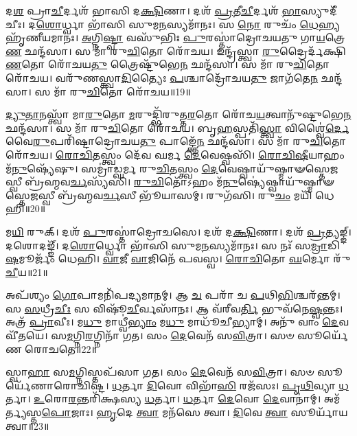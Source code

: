 𑌦\-\ul{𑌶} 𑌪𑍍𑌰𑌾\-\ul{𑌚𑍀}\-𑌰𑍍𑌦𑌶᳴ 𑌭𑌾𑌸𑌿 𑌦\-\ul{𑌕𑍍𑌷𑌿}\-𑌣𑌾। 
𑌦𑌶᳴ \ul{𑌪𑍍𑌰}\-𑌤𑍀\-\ul{𑌚𑍀}\-𑌰𑍍𑌦𑌶᳴ \ul{𑌭𑌾}\-𑌸𑍍𑌯𑍁𑌦𑍀᳴𑌚𑍀𑌃। 
𑌦\-\ul{𑌶𑍋}\-𑌰𑍍𑌧𑍍𑌵𑌾 𑌭𑌾᳴𑌸𑌿 𑌸𑍁𑌮\-\ul{𑌨}\-𑌸𑍍𑌯𑌮𑌾᳴𑌨𑌃। 
𑌸 \ul{𑌨𑍋} 𑌰𑍁𑌚𑌂᳴ \ul{𑌧𑍇}\-𑌹𑍍𑌯𑌹𑍃᳴𑌣𑍀𑌯𑌮𑌾𑌨𑌃। 
\-\ul{𑌅}\-𑌗𑍍𑌨𑌿\-\ul{𑌷𑍍𑌟𑍍𑌵𑌾} 𑌵𑌸𑍁᳴𑌭𑌿𑌃 \ul{𑌪𑍁}\-𑌰𑌸𑍍𑌤𑌾॑𑌦𑍍𑌰𑍋𑌚𑌯𑌤𑍁 𑌗𑌾\-\ul{𑌯}\-𑌤𑍍𑌰𑍇\-\ul{𑌣} 𑌛𑌨𑍍𑌦᳴𑌸𑌾। 
𑌸 𑌮𑌾᳴ 𑌰𑍁\-\ul{𑌚𑌿}\-𑌤𑍋 𑌰𑍋᳴𑌚𑌯। 
𑌇𑌨𑍍𑌦𑍍𑌰᳴𑌸𑍍𑌤𑍍𑌵𑌾 \ul{𑌰𑍁}\-𑌦𑍍𑌰𑍈𑌰𑍍𑌦᳴𑌕𑍍𑌷𑌿\-\ul{𑌣}\-𑌤𑍋 𑌰𑍋᳴𑌚𑌯\-\ul{𑌤𑍁} 𑌤𑍍𑌰𑍈𑌷𑍍𑌟𑍁᳴𑌭𑍇\-\ul{𑌨} 𑌛𑌨𑍍𑌦᳴𑌸𑌾। 
𑌸 𑌮𑌾᳴ 𑌰𑍁\-\ul{𑌚𑌿}\-𑌤𑍋 𑌰𑍋᳴𑌚𑌯। 
𑌵𑌰𑍁᳴𑌣𑌸𑍍𑌤𑍍𑌵𑌾\-\ul{𑌦𑌿}\-𑌤𑍍𑌯𑍈𑌃 \ul{𑌪}\-𑌶𑍍𑌚𑌾𑌦𑍍𑌰𑍋᳴𑌚𑌯\-\ul{𑌤𑍁} 𑌜𑌾𑌗᳴𑌤𑍇\-\ul{𑌨} 𑌛𑌨𑍍𑌦᳴𑌸𑌾। 
𑌸 𑌮𑌾᳴ 𑌰𑍁\-\ul{𑌚𑌿}\-𑌤𑍋 𑌰𑍋᳴𑌚𑌯॥19॥

\-\ul{𑌦𑍍𑌯𑍁}\-\-\ul{𑌤𑌾}\-𑌨𑌸𑍍𑌤𑍍𑌵𑌾᳴ 𑌮𑌾\-\ul{𑌰𑍁}\-𑌤𑍋 \ul{𑌮}\-𑌰𑍁𑌦𑍍𑌭𑌿᳴𑌰𑍁𑌤𑍍𑌤\-\ul{𑌰}\-𑌤𑍋 𑌰𑍋᳴𑌚\-\ul{𑌯}\-𑌤𑍍𑌵𑌾𑌨𑍁᳴𑌷𑍍𑌟𑍁𑌭𑍇\-\ul{𑌨} 𑌛𑌨𑍍𑌦᳴𑌸𑌾। 
𑌸 𑌮𑌾᳴ 𑌰𑍁\-\ul{𑌚𑌿}\-𑌤𑍋 𑌰𑍋᳴𑌚𑌯। 
𑌬𑍃\-\ul{𑌹}\-𑌸𑍍𑌪𑌤𑌿᳴\-\ul{𑌸𑍍𑌤𑍍𑌵𑌾} 𑌵𑌿𑌶𑍍𑌵𑍈॑\-\ul{𑌰𑍍𑌦𑍇}\-𑌵𑍈\-\ul{𑌰𑍁}\-𑌪𑌰𑌿᳴𑌷𑍍𑌟𑌾𑌦𑍍𑌰𑍋𑌚𑌯\-\ul{𑌤𑍁} 𑌪𑌾𑌙𑍍𑌕𑍍𑌤𑍇᳴\-\ul{𑌨} 𑌛𑌨𑍍𑌦᳴𑌸𑌾। 
𑌸 𑌮𑌾᳴ 𑌰𑍁\-\ul{𑌚𑌿}\-𑌤𑍋 𑌰𑍋᳴𑌚𑌯। 
\-\ul{𑌰𑍋}\-\-\ul{𑌚𑌿}\-𑌤𑌸𑍍𑌤𑍍𑌵𑌂 𑌦𑍇᳴𑌵 𑌘𑌰𑍍𑌮 \ul{𑌦𑍇}\-𑌵𑍇𑌷𑍍𑌵𑌸𑌿᳴। 
\-\ul{𑌰𑍋}\-\-\ul{𑌚𑌿}\-\-\ul{𑌷𑍀}\-𑌯𑌾𑌹𑌂 𑌮᳴\-\ul{𑌨𑍁}\-𑌷𑍍𑌯𑍇᳴𑌷𑍁। 
𑌸𑌮𑍍𑌰𑌾॑𑌡𑍍𑌘𑌰𑍍𑌮 𑌰𑍁\-\ul{𑌚𑌿}\-𑌤𑌸𑍍𑌤𑍍𑌵𑌂 \ul{𑌦𑍇}\-𑌵𑍇𑌷𑍍𑌵𑌾𑌯𑍁᳴𑌷𑍍𑌮𑌾𑍟𑌸𑍍𑌤𑍇\-\ul{𑌜}\-𑌸𑍍𑌵𑍀 𑌬𑍍𑌰᳴𑌹𑍍𑌮𑌵\-\ul{𑌰𑍍𑌚}\-𑌸𑍍𑌯᳴𑌸𑌿। 
\-\ul{𑌰𑍁}\-\-\ul{𑌚𑌿}\-𑌤𑍋᳴𑌽𑌹𑌂 𑌮᳴\-\ul{𑌨𑍁}\-𑌷𑍍𑌯𑍇॑𑌷𑍍𑌵𑌾𑌯𑍁᳴𑌷𑍍𑌮𑌾𑍟𑌸𑍍𑌤𑍇\-\ul{𑌜}\-𑌸𑍍𑌵𑍀 𑌬𑍍𑌰᳴𑌹𑍍𑌮𑌵\-\ul{𑌰𑍍𑌚}\-𑌸𑍀 𑌭𑍂᳴𑌯𑌾𑌸𑌮𑍍। 
𑌰𑍁𑌗᳴𑌸𑌿। 
𑌰𑍁\-\ul{𑌚𑌂} 𑌮𑌯𑌿᳴ 𑌧𑍇𑌹𑌿॥20॥

𑌮\-\ul{𑌯𑌿} 𑌰𑍁𑌕𑍍। 
𑌦𑌶᳴ \ul{𑌪𑍁}\-𑌰𑌸𑍍𑌤𑌾॑𑌦𑍍𑌰𑍋𑌚𑌸𑍇। 
𑌦𑌶᳴ 𑌦\-\ul{𑌕𑍍𑌷𑌿}\-𑌣𑌾। 
𑌦𑌶᳴ \ul{𑌪𑍍𑌰}\-𑌤𑍍𑌯𑌙𑍍𑌙𑍍। 
𑌦𑌶𑍋𑌦𑌙𑍍𑌙𑍍᳴। 
𑌦\-\ul{𑌶𑍋}\-𑌰𑍍𑌧𑍍𑌵𑍋 𑌭𑌾᳴𑌸𑌿 𑌸𑍁𑌮\-\ul{𑌨}\-𑌸𑍍𑌯𑌮𑌾᳴𑌨𑌃। 
𑌸 𑌨𑌃᳴ 𑌸\-\ul{𑌮𑍍𑌰𑌾}\-𑌡𑌿\-\ul{𑌷}\-𑌮𑍂𑌰𑍍𑌜𑌂᳴ 𑌧𑍇𑌹𑌿। 
\-\ul{𑌵𑌾}\-𑌜𑍀 \ul{𑌵𑌾}\-𑌜𑌿𑌨𑍇᳴ 𑌪𑌵𑌸𑍍𑌵। 
\-\ul{𑌰𑍋}\-\-\ul{𑌚𑌿}\-𑌤𑍋 \ul{𑌘}\-𑌰𑍍𑌮𑍋 𑌰𑍁᳴\-\ul{𑌚𑍀}\-𑌯॥21॥
\anuvakamend[\-\ul{𑌰𑍋}\-\-\ul{𑌚}\-\-\ul{𑌯} \ul{𑌧𑍇}\-\-\ul{𑌹𑌿} 𑌨𑌵᳴ 𑌚]

𑌅𑌪᳴𑌶𑍍𑌯𑌂 \ul{𑌗𑍋}\-𑌪𑌾𑌮𑌨𑌿᳴𑌪𑌦𑍍𑌯𑌮𑌾𑌨𑌮𑍍। 
𑌆 \ul{𑌚} 𑌪𑌰𑌾᳴ 𑌚 \ul{𑌪}\-𑌥𑌿\-\ul{𑌭𑌿}\-𑌶𑍍𑌚𑌰᳴𑌨𑍍𑌤𑌮𑍍। 
𑌸 \ul{𑌸}\-𑌧𑍍𑌰𑍀\-\ul{𑌚𑍀𑌃} 𑌸 𑌵𑌿𑌷𑍂᳴\-\ul{𑌚𑍀}\-𑌰𑍍𑌵𑌸𑌾᳴𑌨𑌃। 
𑌆 𑌵᳴𑌰𑍀𑌵\-\ul{𑌰𑍍𑌤𑌿} 𑌭𑍁𑌵᳴𑌨𑍇\-\ul{𑌷𑍍𑌵}\-𑌨𑍍𑌤𑌃। 
𑌅𑌤𑍍𑌰᳴ \ul{𑌪𑍍𑌰𑌾}\-𑌵𑍀𑌃। 
𑌮\-\ul{𑌧𑍁} 𑌮𑌾𑌧𑍍𑌵𑍀॑\-\ul{𑌭𑍍𑌯𑌾𑌂} 𑌮\-\ul{𑌧𑍁} 𑌮𑌾𑌧𑍂᳴𑌚𑍀𑌭𑍍𑌯𑌾𑌮𑍍। 
𑌅𑌨𑍁᳴ 𑌵𑌾𑌂 \ul{𑌦𑍇}\-𑌵𑌵𑍀᳴𑌤𑌯𑍇। 
𑌸\-\ul{𑌮}\-𑌗𑍍𑌨𑌿\-\ul{𑌰}\-𑌗𑍍𑌨𑌿𑌨𑌾᳴ 𑌗𑌤। 
𑌸𑌂 \ul{𑌦𑍇}\-𑌵𑍇𑌨᳴ 𑌸\-\ul{𑌵𑌿}\-𑌤𑍍𑌰𑌾। 
𑌸𑍞 𑌸𑍂𑌰𑍍𑌯𑍇᳴𑌣 𑌰𑍋𑌚𑌤𑍇॥22॥

𑌸𑍍𑌵𑌾\-\ul{𑌹𑌾} 𑌸\-\ul{𑌮}\-𑌗𑍍𑌨𑌿𑌸𑍍𑌤𑌪᳴𑌸𑌾 𑌗𑌤। 
𑌸𑌂 \ul{𑌦𑍇}\-𑌵𑍇𑌨᳴ 𑌸\-\ul{𑌵𑌿}\-𑌤𑍍𑌰𑌾। 
𑌸𑍞 𑌸𑍂𑌰𑍍𑌯𑍇᳴𑌣𑌾𑌰𑍋𑌚𑌿𑌷𑍍𑌟। 
\-\ul{𑌧}\-𑌰𑍍𑌤𑌾 \ul{𑌦𑌿}\-𑌵𑍋 𑌵𑌿𑌭𑌾᳴\-\ul{𑌸𑌿} 𑌰𑌜᳴𑌸𑌃। 
\-\ul{𑌪𑍃}\-\-\ul{𑌥𑌿}\-𑌵𑍍𑌯𑌾 \ul{𑌧}\-𑌰𑍍𑌤𑌾। 
\-\ul{𑌉}\-𑌰𑍋\-\ul{𑌰}\-𑌨𑍍𑌤𑌰𑌿᳴𑌕𑍍𑌷𑌸𑍍𑌯 \ul{𑌧}\-𑌰𑍍𑌤𑌾। 
\-\ul{𑌧}\-𑌰𑍍𑌤𑌾 \ul{𑌦𑍇}\-𑌵𑍋 \ul{𑌦𑍇}\-𑌵𑌾𑌨𑌾॑𑌮𑍍। 
𑌅𑌮᳴𑌰𑍍𑌤𑍍𑌯𑌸𑍍𑌤\-\ul{𑌪𑍋}\-𑌜𑌾𑌃। 
\-\ul{𑌹𑍃}\-𑌦𑍇 \ul{𑌤𑍍𑌵𑌾} 𑌮𑌨᳴𑌸𑍇 𑌤𑍍𑌵𑌾। 
\-\ul{𑌦𑌿}\-𑌵𑍇 \ul{𑌤𑍍𑌵𑌾} 𑌸𑍂𑌰𑍍𑌯𑌾᳴𑌯 𑌤𑍍𑌵𑌾॥23॥

